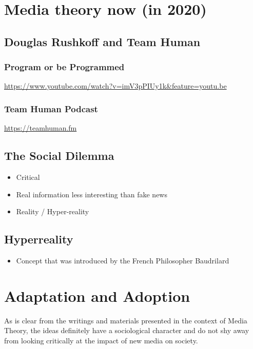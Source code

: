 \documentclass[11pt]{article}
\begin{document}
\section{Media theory now (in 2020)}
\label{sec:org0c3b294}

\subsection{Douglas Rushkoff and Team Human}
\label{sec:orgf4f1077}
\subsubsection{Program or be Programmed}
\label{sec:org0a6fbd2}
\url{https://www.youtube.com/watch?v=imV3pPIUy1k\&feature=youtu.be}

\subsubsection{Team Human Podcast}
\label{sec:orgc5bd9a5}
\url{https://teamhuman.fm}

\subsection{The Social Dilemma}
\label{sec:orgb19e4ad}
\begin{itemize}
\item Critical
\item Real information less interesting than fake news
\item Reality / Hyper-reality
\end{itemize}

\subsection{Hyperreality}
\label{sec:org74a568c}
\begin{itemize}
\item Concept that was introduced by the French Philosopher Baudrilard
\end{itemize}



\section{Adaptation and Adoption}
\label{sec:org73a3fc3}

As is clear from the writings and materials presented in the context of Media Theory,
the ideas definitely have a sociological character and do not shy away from looking 
critically at the impact of new media on society. 
\end{document}
